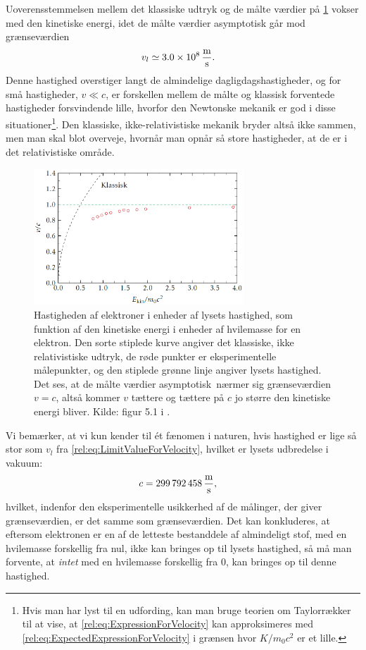 %
Uoverensstemmelsen mellem det klassiske udtryk og de målte værdier på \cref{rel:fig:ClassicalVsRelativisticVelocity} vokser med den kinetiske energi, idet de målte værdier asymptotisk går mod grænseværdien
%
\begin{align} \label{rel:eq:LimitValueForVelocity}
    v_l &\simeq \SI{3.0e8}{\frac{\metre}{\second}}.
\end{align}
%
Denne hastighed overstiger langt de almindelige dagligdagshastigheder, og for små hastigheder, $v \ll c$, er forskellen mellem de målte og klassisk forventede hastigheder forsvindende lille, hvorfor den Newtonske mekanik er god i disse situationer\footnote{Hvis man har lyst til en udfording, kan man bruge teorien om Taylorrækker til at vise, at \cref{rel:eq:ExpressionForVelocity} kan approksimeres med \cref{rel:eq:ExpectedExpressionForVelocity} i grænsen hvor $K/m_0c^2$ er et lille.}. Den klassiske, ikke-relativistiske mekanik bryder altså ikke sammen, men man skal blot overveje, hvornår man opnår så store hastigheder, at de er i det relativistiske område.
%
\begin{figure}[t]
    \centering
    \includegraphics[width=0.7\textwidth]{Rel/RelLorent/ClassicalVsRelativisticVelocityUggerhoej.PNG}
    \caption[]{Hastigheden af elektroner i enheder af lysets hastighed, som funktion af den kinetiske energi i enheder af hvilemasse for en elektron. Den sorte stiplede kurve angiver det klassiske, ikke relativistiske udtryk, de røde punkter er eksperimentelle målepunkter, og den stiplede grønne linje angiver lysets hastighed. Det ses, at de målte værdier asymptotisk~nærmer sig grænseværdien $v = c$, altså kommer $v$ tættere og tættere på $c$ jo større den kinetiske energi bliver. Kilde: figur 5.1 i \cite{uggerhojSpecielRelativitetsteori2016}.}
    \label{rel:fig:ClassicalVsRelativisticVelocity}
\end{figure}

Vi bemærker, at vi kun kender til ét fænomen i naturen, hvis hastighed er lige så stor som $v_l$ fra \cref{rel:eq:LimitValueForVelocity}, hvilket er lysets udbredelse i vakuum:
%
\begin{align}
    c &= \SI{299792458}{\frac{\metre}{\second}},
\end{align}
%
hvilket, indenfor den eksperimentelle usikkerhed af de målinger, der giver grænseværdien, er det samme som grænseværdien.
Det kan konkluderes, at eftersom elektronen er en af de letteste bestanddele af almindeligt stof, med en hvilemasse forskellig fra nul, ikke kan bringes op til lysets hastighed, så må man forvente, at \emph{intet} med en hvilemasse forskellig fra $0$, kan bringes op til denne hastighed.